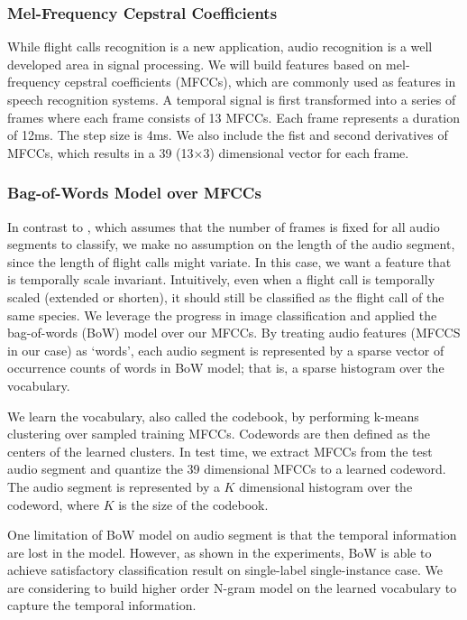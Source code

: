 \documentclass{article} %
\begin{document}
\subsubsection{Mel-Frequency Cepstral Coefficients}
While flight calls recognition is a new application, audio recognition is a well developed area in signal processing. We will build features based on  mel-frequency cepstral coefficients (MFCCs), which are commonly used as features in speech recognition systems. A temporal signal is first transformed into a series of frames where each frame consists of 13 MFCCs. Each frame represents a duration of 12ms. The step size is 4ms. We also include the fist and second derivatives of MFCCs, which results in a 39 (13$\times$3) dimensional vector for each frame.

\subsubsection{Bag-of-Words Model over MFCCs}
\label{sec:bow}

In contrast to \cite{Dufour_NIPSW13}, which assumes that the number of frames is fixed for all audio segments to classify, we make no assumption on the length of the audio segment, since the length of flight calls might variate. In this case, we want a feature that is temporally scale invariant. Intuitively, even when a flight call is temporally scaled (extended or shorten), it should still be classified as the flight call of the same species. We leverage the progress in image classification and applied the bag-of-words (BoW) model \cite{Li_CVPR05} over our MFCCs. By treating audio features (MFCCS in our case) as `words', each audio segment is represented by a sparse vector of occurrence counts of words in BoW model; that is, a sparse histogram over the vocabulary.

We learn the vocabulary, also called the codebook, by performing k-means clustering over sampled training MFCCs. Codewords are then defined as the centers of the learned clusters. In test time, we extract MFCCs from the test audio segment and quantize the 39 dimensional MFCCs to a learned codeword. The audio segment is represented by a $K$ dimensional histogram over the codeword, where $K$ is the size of the codebook. 

One limitation of BoW model on audio segment is that the temporal information are lost in the model. However, as shown in the experiments, BoW is able to achieve satisfactory classification result on single-label single-instance case. We are considering to build higher order N-gram model on the learned vocabulary to capture the temporal information.
\end{document}
